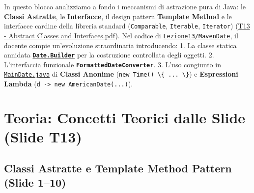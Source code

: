 \documentclass[11pt,a4paper,oneside]{report}
\newcommand{\passthrough}[1]{#1}
\begin{document}
In questo blocco analizziamo a fondo i meccanismi di astrazione pura di
Java: le \textbf{Classi Astratte}, le \textbf{Interfacce}, il design
pattern \textbf{Template Method} e le interfacce cardine della libreria
standard (\passthrough{\lstinline!Comparable!},
\passthrough{\lstinline!Iterable!}, \passthrough{\lstinline!Iterator!})
(\href{file:///home/wally/Documenti/GitHub/Programmazione-II/25-26/Teoria-e-Esercitazioni/Slides-20260902/T13\%20-\%20Abstract\%20Classes\%20and\%20Interfaces.pdf}{T13
- Abstract Classes and Interfaces.pdf}). Nel codice di
\href{file:///home/wally/Documenti/GitHub/Programmazione-II/25-26/Teoria-e-Esercitazioni/Codice-20260902/Lezione13/MavenDate}{\passthrough{\lstinline!Lezione13/MavenDate!}},
il docente compie un'evoluzione straordinaria introducendo: 1. La classe
statica annidata
\textbf{\href{file:///home/wally/Documenti/GitHub/Programmazione-II/25-26/Teoria-e-Esercitazioni/Codice-20260902/Lezione13/MavenDate/src/main/java/it/oop/core/Date.java}{\passthrough{\lstinline!Date.Builder!}}}
per la costruzione controllata degli oggetti. 2. L'interfaccia
funzionale
\textbf{\href{file:///home/wally/Documenti/GitHub/Programmazione-II/25-26/Teoria-e-Esercitazioni/Codice-20260902/Lezione13/MavenDate/src/main/java/it/oop/core/FormattedDateConverter.java}{\passthrough{\lstinline!FormattedDateConverter!}}}.
3. L'uso congiunto in
\href{file:///home/wally/Documenti/GitHub/Programmazione-II/25-26/Teoria-e-Esercitazioni/Codice-20260902/Lezione13/MavenDate/src/main/java/it/oop/ui/MainDate.java}{\passthrough{\lstinline!MainDate.java!}}
di \textbf{Classi Anonime}
(\passthrough{\lstinline!new Time() \{ ... \}!}) e \textbf{Espressioni
Lambda} (\passthrough{\lstinline!d -> new AmericanDate(...)!}).

\section{Teoria: Concetti Teorici dalle Slide (Slide
T13)}\label{chap12_teoria-concetti-teorici-dalle-slide-slide-t13}

\subsection{Classi Astratte e Template Method Pattern (Slide
1--10)}\label{chap12_classi-astratte-e-template-method-pattern-slide-110}
\end{document}
